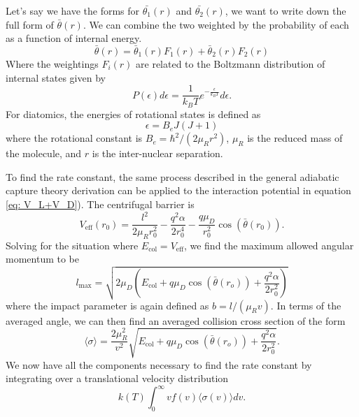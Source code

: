 Let's say we have the forms for $\bar{\theta_1}(r)$ and $\bar{\theta_2}(r)$, we want to write down the full form of $\bar{\theta}(r)$. We can combine the two weighted by the probability of each as a function of internal energy.
\begin{equation}
    \bar{\theta}(r) = \bar{\theta}_1(r) F_1(r) + \bar{\theta}_2(r) F_2(r) \label{eq: weighted theta}
\end{equation}
Where the weightings $F_i(r)$ are related to the Boltzmann distribution of internal states given by
\begin{equation*}
    P(\epsilon) d\epsilon = \frac{1}{k_BT}e^{-\frac{\epsilon}{k_BT}}d\epsilon.
\end{equation*}
For diatomics, the energies of rotational states is defined as
\begin{equation*}
    \epsilon = B_e J(J+1)
\end{equation*}
where the rotational constant is $B_e=\hbar^2/(2\mu_R r^2)$, $\mu_R$ is the reduced mass of the molecule, and $r$ is the inter-nuclear separation.

To find the rate constant, the same process described in the general adiabatic capture theory derivation can be applied to the interaction potential in equation \ref{eq: V_L+V_D}). The centrifugal barrier is
\begin{equation*}
	V_{\mathrm{eff}}(r_0) = \dfrac{l^2}{2 \mu_R r_0^2} - \dfrac{q^2 \alpha}{2r_0^4} - \dfrac{q\mu_D}{r_0^2} \cos(\bar{\theta}(r_0)).
\end{equation*}
Solving for the situation where $E_{\mathrm{col}} = V_{\mathrm{eff}}$, we find the maximum allowed angular momentum to be
\begin{equation*}
	l_{\max} = \sqrt{2\mu_D \left(E_{\mathrm{col}} + q \mu_D \cos(\bar{\theta}(r_o)) + \dfrac{q^2 \alpha}{2 r_0^2}\right)}
\end{equation*}
where the impact parameter is again defined as $b=l/(\mu_R v)$. In terms of the averaged angle, we can then find an averaged collision cross section of the form
\begin{equation*}
	\langle \sigma \rangle = \dfrac{2 \mu_R^2}{v^2} \sqrt{E_{\mathrm{col}} + q \mu_D \cos(\bar{\theta}(r_o)) + \dfrac{q^2 \alpha}{2 r_0^2}}.
\end{equation*}
We now have all the components necessary to find the rate constant by integrating over a translational velocity distribution
\begin{equation*}
	k(T) \int_0^\infty v f(v) \langle \sigma(v) \rangle dv.
\end{equation*}

